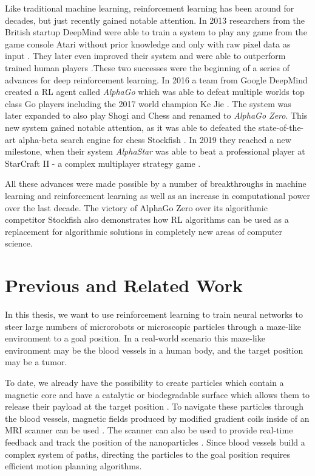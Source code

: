  Like traditional machine learning, reinforcement learning has been around for decades, but just recently gained notable attention. In 2013 researchers from the British startup DeepMind were able to train a system to play any game from the game console Atari without prior knowledge and only with raw pixel data as input \cite{mnih2013playing}. They later even improved their system and were able to outperform trained human players \cite{mnih2015human}.These two successes were the beginning of a series of advances for deep reinforcement learning. In 2016 a team from Google DeepMind created a RL agent called \textit{AlphaGo} which was able to defeat multiple worlds top class Go players including the 2017 world champion Ke Jie \cite{borowiec2016alphago}. The system was later expanded to also play Shogi and Chess and renamed to \textit{AlphaGo Zero}. This new system gained notable attention, as it was able to defeated the state-of-the-art alpha-beta search engine for chess Stockfish \cite{silver2017mastering}. In 2019 they reached a new milestone, when their system \textit{AlphaStar} was able to beat a professional player at StarCraft II - a complex multiplayer strategy game \cite{arulkumaran2019alphastar}. 

 All these advances were made possible by a number of breakthroughs in machine learning and reinforcement learning as well as an increase in computational power over the last decade. The victory of AlphaGo Zero over its algorithmic competitor Stockfish also demonstrates how RL algorithms can be used as a replacement for algorithmic solutions in completely new areas of computer science. 


\section{Previous and Related Work} \label{sec:RelatedWork}
In this thesis, we want to use reinforcement learning to train neural networks to steer large numbers of microrobots or microscopic particles through a maze-like environment to a goal position. In a real-world scenario this maze-like environment may be the blood vessels in a human body, and the target position may be a tumor. 

To date, we already have the possibility to create particles which contain a magnetic core and have a catalytic or biodegradable surface which allows them to release their payload at the target position \cite{litvinov2012high, mellal2015magnetic}. To navigate these particles through the blood vessels, magnetic fields produced by modified gradient coils inside of an MRI scanner can be used \cite{mathieu2007magnetic, mathieu2010steering}. The scanner can also be used to provide real-time feedback and track the position of the nanoparticles \cite{pouponneau2009magnetic}. Since blood vessels build a complex system of paths, directing the particles to the goal position requires efficient motion planning algorithms. 

